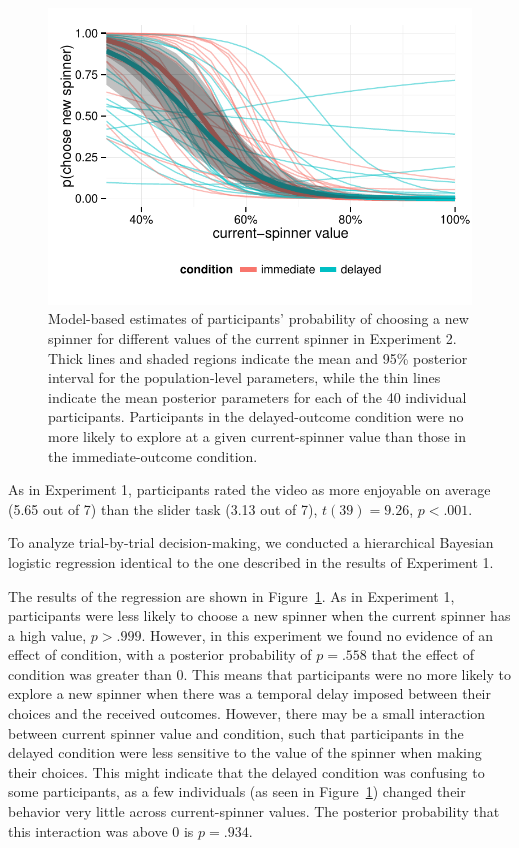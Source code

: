 \documentclass[10pt,letterpaper]{article}
\begin{document}
\begin{figure}
\centering
\includegraphics[width=\columnwidth]{figures/exp2results.pdf}
\caption{Model-based estimates of participants' probability of choosing a new
  spinner for different values of the current spinner in Experiment 2. Thick
  lines and shaded regions indicate the mean and 95\% posterior interval for the
  population-level parameters, while the thin lines indicate the mean posterior
  parameters for each of the 40 individual participants. Participants in the
  delayed-outcome condition were no more
  likely to explore at a given current-spinner value than those in the
  immediate-outcome condition.}
\label{fig:exp2results}
\end{figure}

As in Experiment 1, participants rated the video as more enjoyable on average (5.65 out of 7) than the
slider task (3.13 out of 7), $t(39)=9.26$, $p<.001$.

To analyze trial-by-trial decision-making, we conducted a hierarchical Bayesian
logistic regression identical to the one described in the results of Experiment 1.

The results of the regression are shown in Figure~\ref{fig:exp2results}. As in Experiment 1,
participants were less likely to choose a new spinner when the current spinner
has a high value, $p>.999$. However, in this experiment we found no evidence of
an effect of condition, with a posterior probability of $p=.558$ that the effect of condition was
greater than 0. This means that participants were no more likely to explore a new spinner when there
was a temporal delay imposed between their choices and the received outcomes.
However, there may be a small interaction between current spinner value and
condition, such that participants in the delayed condition were less sensitive
to the value of the spinner when making their choices. This might indicate that
the delayed condition was confusing to some participants, as a few individuals
(as seen in Figure~\ref{fig:exp2results}) changed their behavior very little
across current-spinner values. The posterior probability that this interaction
was above 0 is $p=.934$.
\end{document}
